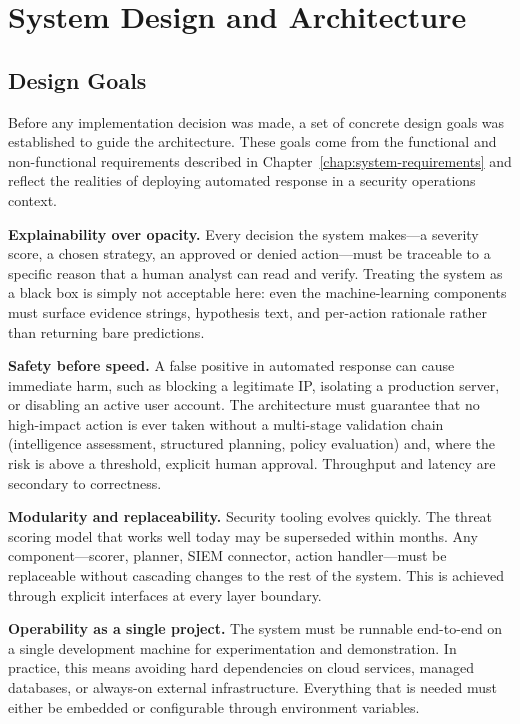 \chapter{System Design and Architecture}
\label{chap:system-architecture}

\section{Design Goals}

Before any implementation decision was made, a set of concrete design goals was
established to guide the architecture. These goals come from the functional
and non-functional requirements described in Chapter~\ref{chap:system-requirements}
and reflect the realities of deploying automated response in a security operations
context.

\textbf{Explainability over opacity.} Every decision the system makes---a severity
score, a chosen strategy, an approved or denied action---must be traceable to a
specific reason that a human analyst can read and verify. Treating the system as a
black box is simply not acceptable here: even the machine-learning components must
surface evidence strings, hypothesis text, and per-action rationale rather than
returning bare predictions.

\textbf{Safety before speed.} A false positive in automated response can cause
immediate harm, such as blocking a legitimate IP, isolating a production server,
or disabling an active user account. The architecture must guarantee
that no high-impact action is ever taken without a multi-stage validation chain
(intelligence assessment, structured planning, policy evaluation) and, where the
risk is above a threshold, explicit human approval. Throughput and latency are
secondary to correctness.

\textbf{Modularity and replaceability.} Security tooling evolves quickly. The threat
scoring model that works well today may be superseded within months. Any component---scorer,
planner, SIEM connector, action handler---must be replaceable without cascading changes
to the rest of the system. This is achieved through explicit interfaces at every layer
boundary.

\textbf{Operability as a single project.} The system must be runnable end-to-end on
a single development machine for experimentation and demonstration. In practice, this
means avoiding hard dependencies on cloud services, managed databases, or always-on
external infrastructure. Everything that is needed must either be embedded or
configurable through environment variables.

